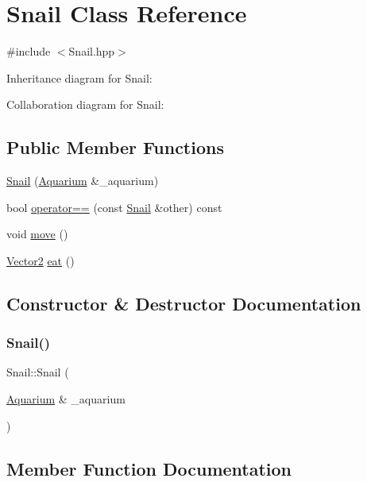 \hypertarget{class_snail}{}\section{Snail Class Reference}
\label{class_snail}


{\ttfamily \#include $<$Snail.\+hpp$>$}



Inheritance diagram for Snail\+:


Collaboration diagram for Snail\+:
\subsection*{Public Member Functions}
\begin{DoxyCompactItemize}
\item 
\mbox{\hyperlink{class_snail_acda391321646989553f4547dd793fa9c}{Snail}} (\mbox{\hyperlink{class_aquarium}{Aquarium}} \&\+\_\+aquarium)
\item 
bool \mbox{\hyperlink{class_snail_ab01308256de08e789ca752e1608120f7}{operator==}} (const \mbox{\hyperlink{class_snail}{Snail}} \&other) const
\item 
void \mbox{\hyperlink{class_snail_af5892ec122d9199480c813b74488256b}{move}} ()
\item 
\mbox{\hyperlink{struct_vector2}{Vector2}} \mbox{\hyperlink{class_snail_a0905a469c6333970b8246abca37795f1}{eat}} ()
\end{DoxyCompactItemize}


\subsection{Constructor \& Destructor Documentation}
\mbox{\label{class_snail_acda391321646989553f4547dd793fa9c}} 
\subsubsection{\texorpdfstring{Snail()}{Snail()}}
{\footnotesize\ttfamily Snail\+::\+Snail (\begin{DoxyParamCaption}\item[{\mbox{\hyperlink{class_aquarium}{Aquarium}} \&}]{\+\_\+aquarium }\end{DoxyParamCaption})}



\subsection{Member Function Documentation}
\mbox{\label{class_snail_a0905a469c6333970b8246abca37795f1}} 
